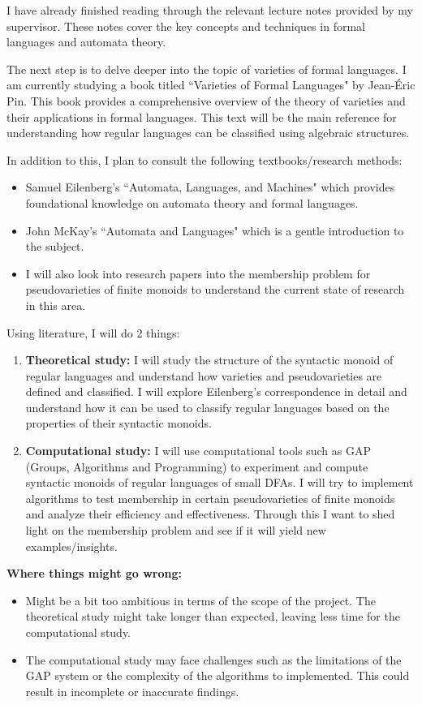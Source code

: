 I have already finished reading through the relevant lecture notes provided by my supervisor. These notes cover the key concepts and techniques in formal languages and automata theory.

The next step is to delve deeper into the topic of varieties of formal languages. I am currently studying a book titled ``Varieties of Formal Languages" by Jean-Éric Pin. This book provides a comprehensive overview of the theory of varieties and their applications in formal languages.
This text will be the main reference for understanding how regular languages can be classified using algebraic structures.

In addition to this, I plan to consult the following textbooks/research methods:
\begin{itemize}
    \item Samuel Eilenberg's ``Automata, Languages, and Machines" which provides foundational knowledge on automata theory and formal languages.
    \item John McKay's ``Automata and Languages" which is a gentle introduction to the subject.
    \item I will also look into research papers into the membership problem for pseudovarieties of finite monoids to understand the current state of research in this area.
\end{itemize}

Using literature, I will do 2 things:

\begin{enumerate}
    \item {\bf Theoretical study:} I will study the structure of the syntactic monoid of regular languages and understand how varieties and pseudovarieties are defined and classified. I will explore Eilenberg's correspondence in detail and understand how it can be used to classify regular languages based on the properties of their syntactic monoids.
    \item {\bf Computational study:} I will use computational tools such as GAP (Groups, Algorithms and Programming) to experiment and compute syntactic monoids of regular languages of small DFAs. I will try to implement algorithms to test membership in certain pseudovarieties of finite monoids and analyze their efficiency and effectiveness. Through this I want to shed light on the membership problem and see if it will yield new examples/insights.
\end{enumerate}

{\bf Where things might go wrong:}
\begin{itemize}
    \item Might be a bit too ambitious in terms of the scope of the project. The theoretical study might take longer than expected, leaving less time for the computational study.
    \item The computational study may face challenges such as the limitations of the GAP system or the complexity of the algorithms to implemented. This could result in incomplete or inaccurate findings.
\end{itemize}